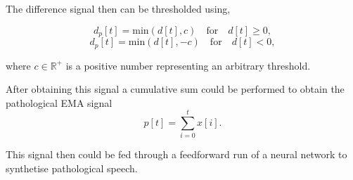 \message{ !name(template.tex)}\documentclass[a4paper]{article}
\begin{document}
The difference signal then can be thresholded using,

\begin{equation}
  d_p[t] = \text{min}(d[t],c) \quad \text{for} \quad d[t] \geq 0, 
  \label{eq2}
\end{equation}
\begin{equation}
  d_p[t] = \text{min}(d[t],-c) \quad \text{for} \quad d[t] < 0,
  \label{eq3}
\end{equation}

where \( c \in \mathbb{R}^{+} \) is a positive number representing an
arbitrary threshold.

After obtaining this signal a cumulative sum could be performed to obtain
the pathological EMA signal
\begin{equation}
  p[t] = \sum_{i=0}^{t} x[i].
  \label{eq4}
\end{equation}

This signal then could be fed through a feedforward run of a neural network
to synthetise pathological speech.


\end{document}
